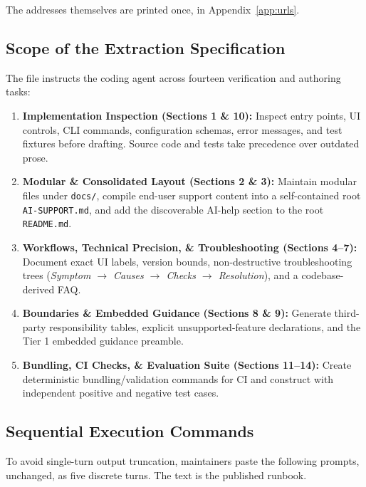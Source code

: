 \documentclass[12pt, a4paper]{article}
\begin{document}
\noindent The addresses themselves are printed once, in Appendix~\ref{app:urls}.

\subsection{Scope of the Extraction Specification}
The  file instructs the coding agent across fourteen verification and authoring tasks:
\begin{enumerate}
    \item \textbf{Implementation Inspection (Sections 1 \& 10):} Inspect entry points, UI controls, CLI commands, configuration schemas, error messages, and test fixtures before drafting. Source code and tests take precedence over outdated prose.
    \item \textbf{Modular \& Consolidated Layout (Sections 2 \& 3):} Maintain modular files under \texttt{docs/}, compile end-user support content into a self-contained root \texttt{AI-SUPPORT.md}, and add the discoverable AI-help section to the root \texttt{README.md}.
    \item \textbf{Workflows, Technical Precision, \& Troubleshooting (Sections 4--7):} Document exact UI labels, version bounds, non-destructive troubleshooting trees (\textit{Symptom $\rightarrow$ Causes $\rightarrow$ Checks $\rightarrow$ Resolution}), and a codebase-derived FAQ.
    \item \textbf{Boundaries \& Embedded Guidance (Sections 8 \& 9):} Generate third-party responsibility tables, explicit unsupported-feature declarations, and the Tier 1 embedded guidance preamble.
    \item \textbf{Bundling, CI Checks, \& Evaluation Suite (Sections 11--14):} Create deterministic bundling/validation commands for CI and construct  with independent positive and negative test cases.
\end{enumerate}

\newpage
\subsection{Sequential Execution Commands}
To avoid single-turn output truncation, maintainers paste the following prompts, unchanged, as five discrete turns. The text is the published runbook.
\end{document}
